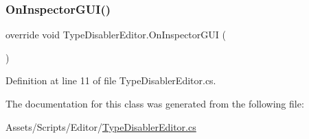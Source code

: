 \subsubsection{\texorpdfstring{On\+Inspector\+G\+U\+I()}{OnInspectorGUI()}}
{\footnotesize\ttfamily override void Type\+Disabler\+Editor.\+On\+Inspector\+G\+UI (\begin{DoxyParamCaption}{ }\end{DoxyParamCaption})}



Definition at line 11 of file Type\+Disabler\+Editor.\+cs.



The documentation for this class was generated from the following file\+:\begin{DoxyCompactItemize}
\item 
Assets/\+Scripts/\+Editor/\mbox{\hyperlink{_type_disabler_editor_8cs}{Type\+Disabler\+Editor.\+cs}}\end{DoxyCompactItemize}
